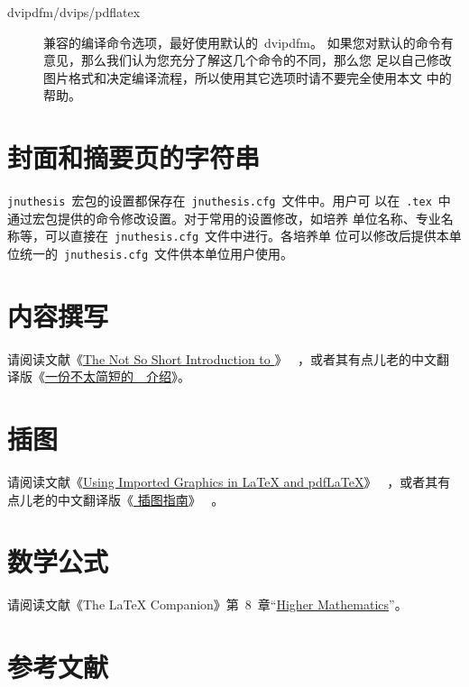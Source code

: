 \documentclass[pdftex, twoside, bachelor]{JNUthesis}
\begin{document}
\begin{spacing}{1.25}
\begin{description}
\item[dvipdfm/dvips/pdflatex] 兼容的编译命令选项，最好使用默认的~dvipdfm。
如果您对默认的命令有意见，那么我们认为您充分了解这几个命令的不同，那么您
足以自己修改图片格式和决定编译流程，所以使用其它选项时请不要完全使用本文
中的帮助。

\end{description}

\section{封面和摘要页的字符串}

\texttt{jnuthesis}~宏包的设置都保存在~\texttt{jnuthesis.cfg}~文件中。用户可
以在~\texttt{.tex}~中通过宏包提供的命令修改设置。对于常用的设置修改，如培养
单位名称、专业名称等，可以直接在~\texttt{jnuthesis.cfg}~文件中进行。各培养单
位可以修改后提供本单位统一的~\texttt{jnuthesis.cfg}~文件供本单位用户使用。

\section{内容撰写}

请阅读文献《\href{http://mirror.ctan.org/info/lshort/english/lshort.pdf}{The Not So Short Introduction to \LaTeXe{}}》
~\cite{Oetiker2008}，或者其有点儿老的中文翻译版《\href{http://mirror.ctan.org/info/lshort/chinese/lshort-zh-cn.pdf}{一份不太简短的~\LaTeXe{}~介绍}》\cite{lshort-cn}。

\section{插图}

请阅读文献《\href{ftp://ftp.tex.ac.uk/tex-archive/info/epslatex.pdf}{Using Imported Graphics in \LaTeX{} and pdf\LaTeX{}}》
~\cite{Reckdahl2006}，或者其有点儿老的中文翻译版《\href{http://www.ctex.org/documents/latex/graphics/}{\LaTeXe{} 插图指南}》
~\cite{Wang1997}。

\section{数学公式}

请阅读文献《The LaTeX Companion》第~8~章``\href{http://media.cism.it/attachments/ch8.pdf}{Higher Mathematics}''\cite{Goossens1997}。


\section{参考文献}


\end{spacing}
\end{document}
